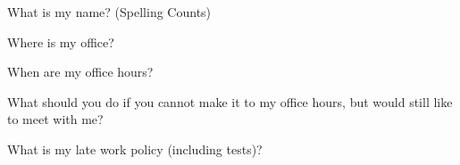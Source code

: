 \documentclass[unboxed]{hwset}
\begin{document}
\begin{problem}[1.]
	What is my name? (Spelling Counts)
\end{problem}

\begin{problem}[2.]
 Where is my office?
\end{problem}

\begin{problem}[3.] 
	When are my office hours?
\end{problem}

\begin{problem}[4.] 
	What should you do if you cannot make it to my office hours, but would still
	like to meet with me?
\end{problem}

\begin{problem}[5.]
 What is my late work policy (including tests)?
\end{problem}
\end{document}

